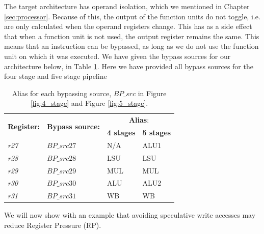 
The target architecture has operand isolation, which we mentioned in Chapter \ref{sec:processor}. Because of this, the output of the function units do not toggle, i.e. are only calculated when the operand registers change. This has as a side effect that when a function unit is not used, the output register remains the same. This means that an instruction can be bypassed, as long as we do not use the function unit on which it was executed. We have given the bypass sources for our architecture below, in Table \ref{table:bypass_alias}. Here we have provided all bypass sources for the four stage and five stage pipeline

\begin{table}[H]
\caption{Alias for each bypassing source, $BP\_src$ in Figure \ref{fig:4_stage} and Figure \ref{fig:5_stage}.}
\begin{center}
\begin{tabular}{@{}llll@{}}
\toprule
\multirow{2}{*}{\textbf{Register:}} & \multirow{2}{*}{\textbf{Bypass source:}} & \multicolumn{2}{c}{\textbf{Alias}:} \\ \cline{3-4}
 & & \textbf{4 stages} & \textbf{5 stages} \\
\hline
\emph{r27} & $BP\_src27$ & N/A & ALU1 \\ 
\emph{r28} & $BP\_src28$ & LSU & LSU \\
\emph{r29} & $BP\_src29$ & MUL & MUL \\ 
\emph{r30} & $BP\_src30$ & ALU & ALU2 \\
\emph{r31} & $BP\_src31$ & WB & WB \\
\bottomrule
\end{tabular}
\end{center}
\label{table:bypass_alias}
\end{table}%


We will now show with an example that avoiding speculative write accesses may reduce Register Pressure (RP).


